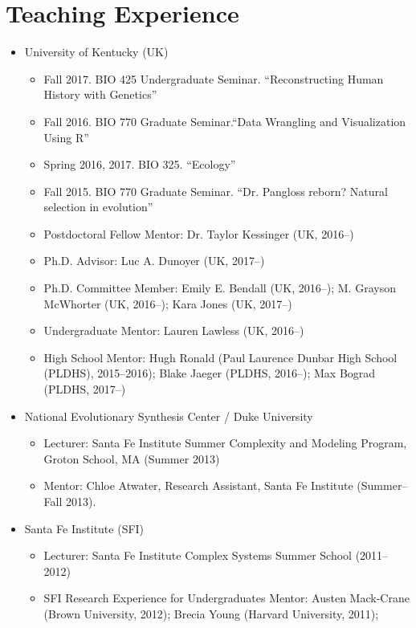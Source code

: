 \documentclass[11pt]{article}
\begin{document}
  \section{Teaching Experience}

  \begin{itemize}
  \item University of Kentucky (UK)
    \begin{itemize}
    \item Fall 2017. BIO 425 Undergraduate Seminar. ``Reconstructing Human History with Genetics''
    \item Fall 2016. BIO 770 Graduate Seminar.``Data Wrangling and Visualization Using R''
    \item Spring 2016, 2017. BIO 325. ``Ecology''
    \item Fall 2015. BIO 770 Graduate Seminar. ``Dr. Pangloss reborn? Natural selection in evolution''
    \item Postdoctoral Fellow Mentor: Dr. Taylor Kessinger (UK, 2016--)
    \item Ph.D. Advisor: Luc A. Dunoyer (UK, 2017--)
    \item Ph.D. Committee Member: Emily E. Bendall (UK, 2016--); M. Grayson McWhorter (UK, 2016--); Kara Jones (UK, 2017--)
    \item Undergraduate Mentor: Lauren Lawless (UK, 2016--)
    \item High School Mentor: Hugh Ronald (Paul Laurence Dunbar High School (PLDHS), 2015--2016); Blake Jaeger (PLDHS, 2016--); Max Bograd (PLDHS, 2017--)
    \end{itemize}
  \item National Evolutionary Synthesis Center / Duke University
    \begin{itemize}
    \item Lecturer: Santa Fe Institute Summer Complexity and Modeling Program, \\
      Groton School, MA (Summer 2013)
    \item Mentor: Chloe Atwater, Research Assistant, Santa Fe Institute (Summer--Fall 2013).
    \end{itemize}
  \item Santa Fe Institute (SFI)
    \begin{itemize}
    \item Lecturer: Santa Fe Institute Complex Systems Summer School (2011--2012)
    \item SFI Research Experience for Undergraduates Mentor: Austen Mack-Crane (Brown University, 2012); Brecia Young (Harvard University, 2011); 

\end{itemize}
\end{itemize}
\end{document}
